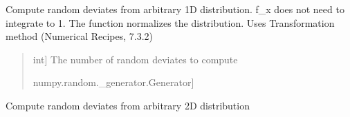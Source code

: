 \documentclass[letterpaper,10pt,english]{sphinxmanual}
\begin{document}
\begin{fulllineitems}

\begin{fulllineitems}
\label{\detokenize{nexoclom2/nexoclom2.initial_state.InputClass:nexoclom2.initial_state.InputClass.InputClass.generate1d}}
\pysigstartsignatures
\pysiglinewithargsret
{}
{\sphinxparamcomma {}}
{}
\pysigstopsignatures
\sphinxAtStartPar
Compute random deviates from arbitrary 1D distribution.
f\_x does not need to integrate to 1. The function normalizes the
distribution. Uses Transformation method (Numerical Recipes, 7.3.2)
\begin{quote}\begin{description}
\begin{description}
\sphinxlineitem{\sphinxstylestrong{n\_packets}}{[}int{]}
\sphinxAtStartPar
The number of random deviates to compute

\sphinxlineitem{\sphinxstylestrong{randgen}}{[}numpy.random.\_generator.Generator{]}
\end{description}

\begin{description}
\end{description}

\end{description}\end{quote}

\end{fulllineitems}


\begin{fulllineitems}
\label{\detokenize{nexoclom2/nexoclom2.initial_state.InputClass:nexoclom2.initial_state.InputClass.InputClass.generate2d}}
\pysigstartsignatures
\pysiglinewithargsret
{}
{\sphinxparamcomma {}\sphinxparamcomma {}}
{}
\pysigstopsignatures
\sphinxAtStartPar
Compute random deviates from arbitrary 2D distribution


\end{fulllineitems}
\end{fulllineitems}
\end{document}
